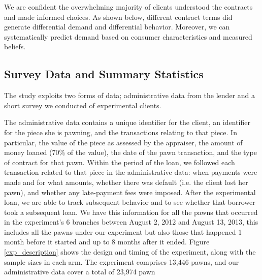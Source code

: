 \documentclass[oneside,11pt]{article}
\begin{document}
We are confident the overwhelming majority of clients understood the contracts and made informed choices. As shown below, different contract terms did generate differential demand and differential behavior. Moreover, we can systematically predict demand based on consumer characteristics and measured beliefs.






\subsection{Survey Data and Summary Statistics}

The study exploits two forms of data; administrative data from the lender and a short survey we conducted of experimental clients.  



The administrative data contains a unique identifier for the client, an identifier for the piece she is pawning, and the transactions relating to that piece. In particular, the value of the piece as assessed by the appraiser, the amount of money loaned (70\% of the value), the date of the pawn transaction, and the type of contract for that pawn. Within the period of the loan, we followed each transaction related to that piece in the administrative data: when payments were made and for what amounts, whether there was default (i.e. the client lost her pawn), and whether any late-payment fees were imposed. After the experimental loan, we are able to track subsequent behavior and to see whether that borrower took a subsequent loan.  We have this information for all the pawns that occurred in the experiment's 6 branches between August 2, 2012 and August 13, 2013, this includes all the pawns under our experiment but also those that happened 1 month before it started and up to 8 months after it ended. Figure \ref{exp_description} shows the design and timing of the experiment, along with the sample sizes in each arm. The experiment comprises 13,446 pawns, and our administrative data cover a total of 23,974 pawn
\end{document}
